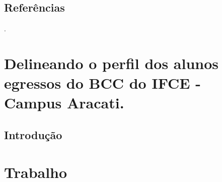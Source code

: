 \documentclass[12pt]{article}
\begin{document}
\subsection{Referências}

\cite{sandel:2015}.




\newpage

\section{Delineando o perfil dos alunos egressos do BCC do IFCE - Campus Aracati.}


\subsection{Introdução}


\newpage
\section{Trabalho}
\end{document}
